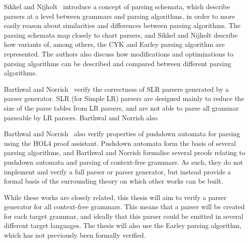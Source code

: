 	Sikkel and Nijholt~\cite{sikkel97} introduce a concept of parsing schemata,
	which describe parsers at a level between grammars and parsing algorithms,
	in order to more easily reason about similarities and differences between
	parsing algorithms. The parsing schemata map closely to chart parsers, and
	Sikkel and Nijholt describe how variants of, among others, the CYK and
	Earley parsing algorithm are represented. The authors also discuss how
	modifications and optimizations to parsing algorithms can be described and
	compared between different parsing algorithms.
	
	Barthwal and Norrish~\cite{barthwal09} verify the correctness of SLR 
	parsers generated by a parser generator. SLR (for Simple LR) parsers are 
	designed mainly to reduce the size of the parse tables from LR parsers, and
	are not able to parse all grammar parseable by LR parsers. Barthwal and 
	Norrish also
	
	Barthwal and Norrish~\cite{barthwal13} also verify properties of pushdown 
	automata for parsing using the HOL4 proof assistant. Pushdown automata form 
	the basis of several parsing algorithms, and Barthwal and Norrish formalise
	several proofs relating to pushdown automata and parsing of context-free 
	grammars. As such, they do not implement and verify a full parser or parser 
	generator, but instead provide a formal basis of the surrounding theory on 
	which other works can be built.

	While these works are closely related, this thesis will aim to verify a
	parser generator for all context-free grammars. This means that a parser
	will be created for each target grammar, and ideally that this parser could
	be emitted in several different target languages. The thesis will also use
	the Earley parsing algorithm, which has not previously been formally
	verified.
